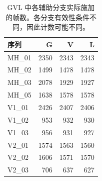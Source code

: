\begin{table}[tb]
\caption{GVL 中各辅助分支实际施加的帧数。各分支有效性条件不同，因此计数可能不同。}\label{tab:updates}
\centering\small
\begin{tabular}{lrrr}
\toprule
序列 & G & V & L \\
\midrule
MH\_01 & 2350 & 2343 & 2343 \\
MH\_02 & 1499 & 1478 & 1478 \\
MH\_03 & 2078 & 1929 & 1927 \\
MH\_05 & 1638 & 1578 & 1578 \\
V1\_01 & 2426 & 2407 & 2406 \\
V1\_02 & 953 & 932 & 930 \\
V1\_03 & 956 & 931 & 927 \\
V2\_01 & 1574 & 1563 & 1560 \\
V2\_02 & 1606 & 1571 & 1570 \\
V2\_03 & 706 & 637 & 627 \\
\bottomrule
\end{tabular}
\end{table}
